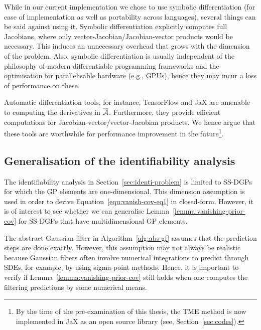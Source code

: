 While in our current implementation we chose to use symbolic differentiation (for ease of implementation as well as portability across languages), several things can be said against using it. Symbolic differentiation explicitly computes full Jacobians, where only vector-Jacobian/Jacobian-vector products would be necessary. This induces an unnecessary overhead that grows with the dimension of the problem. Also, symbolic differentiation is usually independent of the philosophy of modern differentiable programming frameworks and the optimisation for parallelisable hardware (e.g., GPUs), hence they may incur a loss of performance on these.

Automatic differentiation tools, for instance, TensorFlow and JaX are amenable to computing the derivatives in $\overline{\mathcal{A}}$. Furthermore, they provide efficient computations for Jacobian-vector/vector-Jacobian products. We hence argue that these tools are worthwhile for performance improvement in the future\footnote{By the time of the pre-examination of this thesis, the TME method is now implemented in JaX as an open source library (see, Section~\ref{sec:codes}).}.

\subsection*{Generalisation of the identifiability analysis}
The identifiability analysis in Section~\ref{sec:identi-problem} is limited to SS-DGPs for which the GP elements are one-dimensional. This dimension assumption is used in order to derive Equation~\eqref{equ:vanish-cov-eq1} in closed-form. However, it is of interest to see whether we can generalise Lemma~\ref{lemma:vanishing-prior-cov} for SS-DGPs that have multidimensional GP elements.

The abstract Gaussian filter in Algorithm~\ref{alg:abs-gf} assumes that the prediction steps are done exactly. However, this assumption may not always be realistic because Gaussian filters often involve numerical integrations to predict through SDEs, for example, by using sigma-point methods. Hence, it is important to verify if Lemma~\ref{lemma:vanishing-prior-cov} still holds when one computes the filtering predictions by some numerical means.


